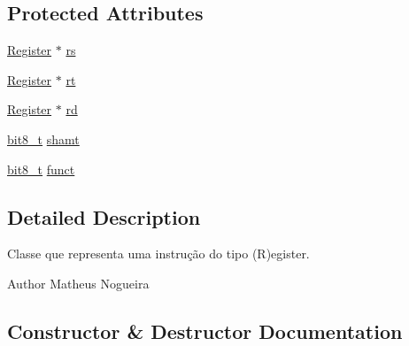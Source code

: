 \subsection*{Protected Attributes}
\begin{DoxyCompactItemize}
\item 
\hyperlink{classMIPS_1_1Register}{Register} $\ast$ \hyperlink{classMIPS_1_1RegisterInstruction_ac901daa914a523f2725e69ffc1fa6982}{rs}
\item 
\hyperlink{classMIPS_1_1Register}{Register} $\ast$ \hyperlink{classMIPS_1_1RegisterInstruction_af6f209ae3da38c3b58c8791837217c07}{rt}
\item 
\hyperlink{classMIPS_1_1Register}{Register} $\ast$ \hyperlink{classMIPS_1_1RegisterInstruction_a440089aa8e302ded14fbccfcb6cd5d4f}{rd}
\item 
\hyperlink{core_8hpp_a6074bae122ae7b527864eec42c728c3c}{bit8\+\_\+t} \hyperlink{classMIPS_1_1RegisterInstruction_a92e140a46c42d4ece7a1b497f9228fdc}{shamt}
\item 
\hyperlink{core_8hpp_a6074bae122ae7b527864eec42c728c3c}{bit8\+\_\+t} \hyperlink{classMIPS_1_1RegisterInstruction_a1e26d32655594e99cbfc576c73ae4f94}{funct}
\end{DoxyCompactItemize}


\subsection{Detailed Description}
Classe que representa uma instrução do tipo (R)egister.

\begin{DoxyAuthor}{Author}
Matheus Nogueira 
\end{DoxyAuthor}


\subsection{Constructor \& Destructor Documentation}
